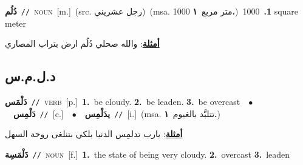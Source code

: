 \documentclass[10pt,a4paper,twoside]{article} %
\begin{document}
\begin{multicols}{2}
{\setlength\topsep{0pt}\textbf{\foreignlanguage{arabic}{دُلُم}}\ {\color{gray}\texttt{//}\color{black}}\ \textsc{noun}\ [m.]\ (src. \color{gray}\foreignlanguage{arabic}{رجل عشريني}\color{black})\ \color{gray}(msa. \foreignlanguage{arabic}{1000 متر مربع}~\foreignlanguage{arabic}{\textbf{١.}})\color{black}\ \textbf{1.}~1000 square meter\  \begin{flushright}\color{gray}\foreignlanguage{arabic}{\textbf{\underline{\foreignlanguage{arabic}{أمثلة}}}: والله صحلي دُلُم ارض بتراب المصاري}\end{flushright}\color{black}} \vspace{2mm}

\vspace{-3mm}
\subsection*{\color{blue}\foreignlanguage{arabic}{د.ل.م.س}\color{blue}{}} 

{\setlength\topsep{0pt}\textbf{\foreignlanguage{arabic}{دَلْمَس}}\ {\color{gray}\texttt{//}\color{black}}\ \textsc{verb}\ [p.]\ \textbf{1.}~be cloudy.  \textbf{2.}~be leaden.  \textbf{3.}~be overcast\ \ $\bullet$\ \ \setlength\topsep{0pt}\textbf{\foreignlanguage{arabic}{دَلْمِس}}\ {\color{gray}\texttt{//}\color{black}}\ [c.]\ \ $\bullet$\ \ \setlength\topsep{0pt}\textbf{\foreignlanguage{arabic}{يدَلْمِس}}\ {\color{gray}\texttt{//}\color{black}}\ [i.]\ \color{gray}(msa. \foreignlanguage{arabic}{تتلبَّد بالغيوم}~\foreignlanguage{arabic}{\textbf{١.}})\color{black}\  \begin{flushright}\color{gray}\foreignlanguage{arabic}{\textbf{\underline{\foreignlanguage{arabic}{أمثلة}}}: يارب تدلمِس الدنيا بلكي بتنلغى روحة السهل}\end{flushright}\color{black}} \vspace{2mm}

{\setlength\topsep{0pt}\textbf{\foreignlanguage{arabic}{دَلْمَسِة}}\ {\color{gray}\texttt{//}\color{black}}\ \textsc{noun}\ [f.]\ \textbf{1.}~the state of being very cloudy.  \textbf{2.}~overcast  \textbf{3.}~leaden\ } \vspace{2mm}


\end{multicols}
\end{document}
